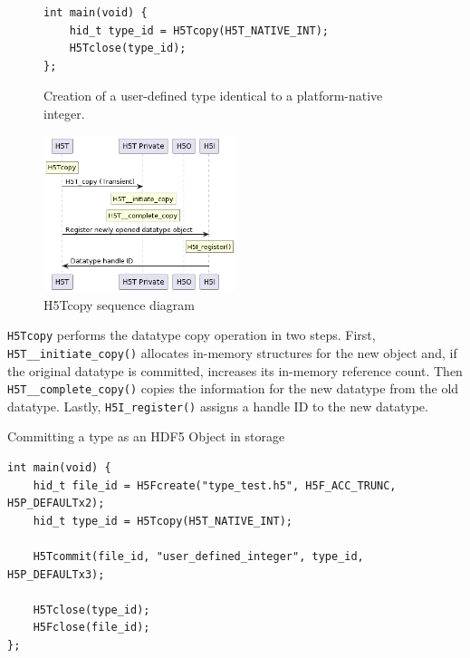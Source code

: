 \begin{figure}
\centering
\caption{Creation of a user-defined type identical to a platform-native integer.}
\label{fig:predefined-type-copy}
\begin{verbatim}
int main(void) {
    hid_t type_id = H5Tcopy(H5T_NATIVE_INT);
    H5Tclose(type_id);
};

\end{verbatim}
\end{figure}

\begin{figure}
    \centering
    \includegraphics[width=0.5\textwidth]{images/tour_5_uml_datatype_copy.png}
    \caption{H5Tcopy sequence diagram}
    \label{fig:tour-5-uml-datatype-copy}
\end{figure}

\texttt{H5Tcopy} performs the datatype copy operation in two steps. First, \texttt{H5T\_\_initiate\_copy()} allocates in-memory structures for the new object and, if the original datatype is committed, increases its in-memory reference count. Then \texttt{H5T\_\_complete\_copy()} copies the information for the new datatype from the old datatype. Lastly, \texttt{H5I\_register()} assigns a handle ID to the new datatype.

\begin{listing}
\centering
\caption{Committing a type as an HDF5 Object in storage}
\label{lst:type-commit}
\begin{verbatim}
int main(void) {
    hid_t file_id = H5Fcreate("type_test.h5", H5F_ACC_TRUNC, H5P_DEFAULTx2);
    hid_t type_id = H5Tcopy(H5T_NATIVE_INT);

    H5Tcommit(file_id, "user_defined_integer", type_id, H5P_DEFAULTx3);

    H5Tclose(type_id);
    H5Fclose(file_id);
};

\end{verbatim}
\end{listing}

